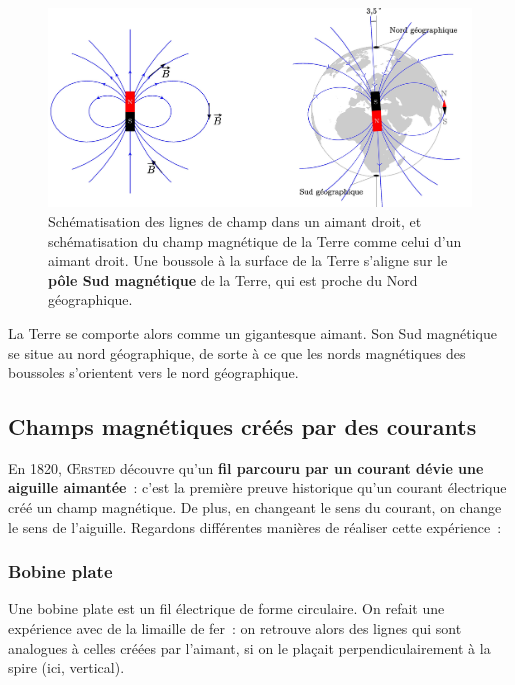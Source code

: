 \documentclass[../../main/main.tex]{subfiles}
\begin{document}
\begin{figure}[h]
	\centering
	\includegraphics[scale=1]{aimdroit.jpg}
	\caption{Schématisation des lignes de champ dans un aimant droit, et
		schématisation du champ magnétique de la Terre comme celui d'un aimant droit.
		Une boussole à la surface de la Terre s'aligne sur le \textbf{pôle Sud magnétique}
		de la Terre, qui est proche du Nord géographique.}
	\label{fig:aimdroitterre}
\end{figure}

La Terre se comporte alors comme un gigantesque aimant. Son Sud magnétique se
situe au nord géographique, de sorte à ce que les nords magnétiques des
boussoles s'orientent vers le nord géographique.

\subsection{Champs magnétiques créés par des courants}
\label{ssec:chpcour}

En 1820, \textsc{Œrsted} découvre qu'un \textbf{fil parcouru par un courant
	dévie une aiguille aimantée}~: c'est la première preuve historique qu'un courant
électrique créé un champ magnétique. De plus, en changeant le sens du courant,
on change le sens de l'aiguille. Regardons différentes manières de réaliser
cette expérience~:

\subsubsection{Bobine plate}
\label{sssec:bplate}
Une bobine plate est un fil électrique de forme circulaire. On refait une
expérience avec de la limaille de fer~: on retrouve alors des lignes qui sont
analogues à celles créées par l'aimant, si on le plaçait perpendiculairement à
la spire (ici, vertical).
\end{document}
